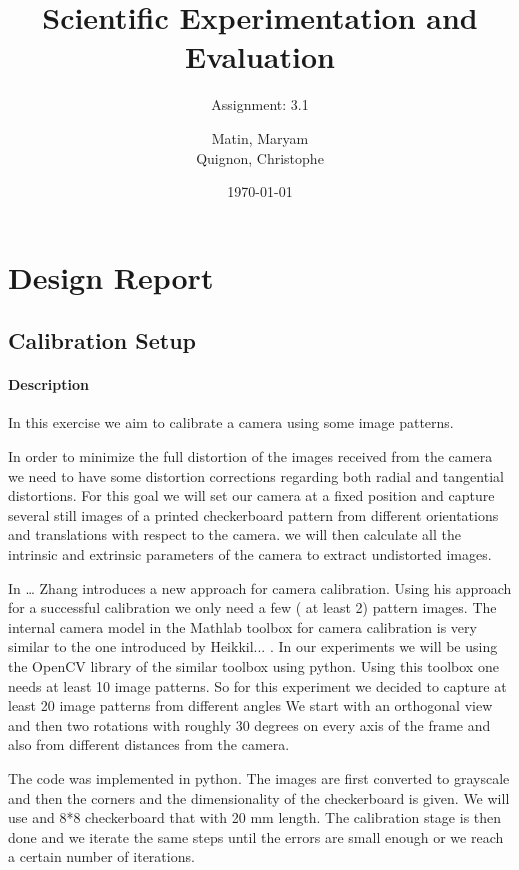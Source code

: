 \documentclass{scrartcl}
\begin{document}
\title{Scientific Experimentation and Evaluation
}
\subtitle{
Assignment: 3.1}
\author{
  Matin, Maryam \\
  Quignon, Christophe
}
\date{\today}


\maketitle


\section{Design Report}

\subsection{Calibration Setup}
\paragraph{Description}

In this exercise we aim to calibrate a camera using some image patterns.

In order to minimize the full distortion of the images received from the camera we need to have some distortion corrections regarding both radial and tangential distortions. For this goal we will set our camera at a fixed position and capture several still images of a printed checkerboard pattern from different orientations and translations with respect to the camera. we will then calculate all the intrinsic and extrinsic parameters of the camera to extract undistorted images. 

In … Zhang introduces a new approach for camera calibration. Using his approach for a successful calibration we only need a few ( at least 2) pattern images. The internal camera model in the Mathlab toolbox for camera calibration is very similar to the one introduced by Heikkil... . In our experiments we will be using the OpenCV library of the similar toolbox using python. Using this toolbox one needs at least 10 image patterns. So for this experiment we decided to capture at least 20 image patterns from different angles We start with an orthogonal view and then two rotations with roughly 30 degrees on every axis of the frame and also from different distances from the camera.

The code was implemented in python. The images are first converted to grayscale and then the corners and the dimensionality of the checkerboard is given. We will use and 8*8 checkerboard that with 20 mm length. The calibration stage is then done and we iterate the same steps until the errors are small enough or we reach a certain number of iterations.
\end{document}
